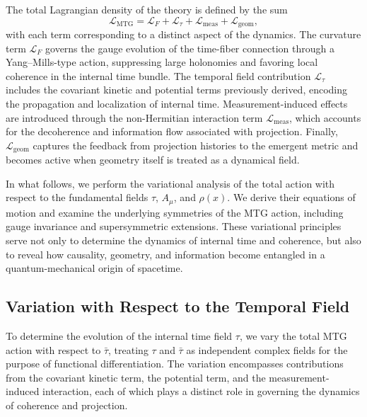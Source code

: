 \documentclass[11pt]{article}
\begin{document}
The total Lagrangian density of the theory is defined by the sum
\begin{equation}
\mathcal{L}_{\mathrm{MTG}} = \mathcal{L}_F + \mathcal{L}_\tau + \mathcal{L}_{\mathrm{meas}} + \mathcal{L}_{\mathrm{geom}},
\end{equation}
with each term corresponding to a distinct aspect of the dynamics. The curvature term \( \mathcal{L}_F \) governs the gauge evolution of the time-fiber connection through a Yang--Mills-type action, suppressing large holonomies and favoring local coherence in the internal time bundle. The temporal field contribution \( \mathcal{L}_\tau \) includes the covariant kinetic and potential terms previously derived, encoding the propagation and localization of internal time. Measurement-induced effects are introduced through the non-Hermitian interaction term \( \mathcal{L}_{\mathrm{meas}} \), which accounts for the decoherence and information flow associated with projection. Finally, \( \mathcal{L}_{\mathrm{geom}} \) captures the feedback from projection histories to the emergent metric and becomes active when geometry itself is treated as a dynamical field.

In what follows, we perform the variational analysis of the total action with respect to the fundamental fields \( \tau \), \( A_\mu \), and \( \rho(x) \). We derive their equations of motion and examine the underlying symmetries of the MTG action, including gauge invariance and supersymmetric extensions. These variational principles serve not only to determine the dynamics of internal time and coherence, but also to reveal how causality, geometry, and information become entangled in a quantum-mechanical origin of spacetime.
\subsection{Variation with Respect to the Temporal Field}

To determine the evolution of the internal time field \( \tau \), we vary the total MTG action with respect to \( \bar{\tau} \), treating \( \tau \) and \( \bar{\tau} \) as independent complex fields for the purpose of functional differentiation. The variation encompasses contributions from the covariant kinetic term, the potential term, and the measurement-induced interaction, each of which plays a distinct role in governing the dynamics of coherence and projection.
\end{document}
